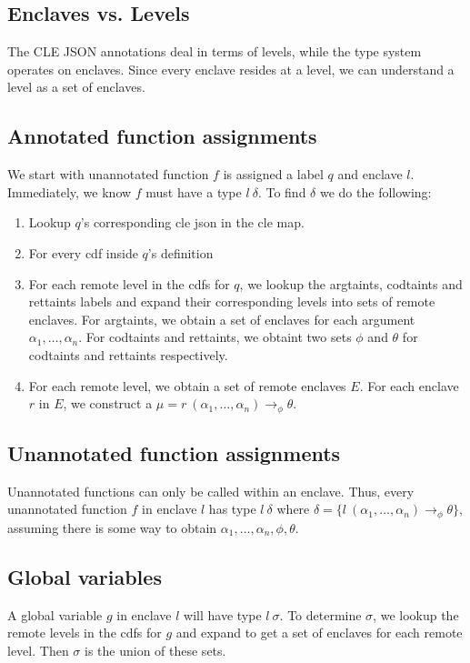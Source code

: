 \documentclass{article}
\begin{document}
\subsection{Enclaves vs. Levels}
The CLE JSON annotations deal in terms of levels, while the type system operates
on enclaves. Since every enclave resides at a level, we can understand a level as
a set of enclaves.

\subsection{Annotated function assignments}
We start with unannotated function $f$ is assigned a label $q$ and enclave $l$.
Immediately, we know $f$ must have a type $l\ \delta$.
To find $\delta$ we do the following: 
\begin{enumerate}
    \item Lookup $q$'s corresponding cle json in the cle map. 
    \item For every cdf inside $q$'s definition
    \item For each remote level in the cdfs for $q$, we lookup the argtaints, 
    codtaints and rettaints labels and expand their corresponding levels into sets of remote enclaves.
    For argtaints, we obtain a set of enclaves for each argument $\alpha_1, \dots, \alpha_n$. 
    For codtaints and rettaints, we obtaint two sets $\phi$ and $\theta$ for codtaints and rettaints 
    respectively. 
    \item For each remote level, we obtain a set of remote enclaves $E$. For each enclave $r$ in $E$,
    we construct a $\mu = r\ (\alpha_1, \dots, \alpha_n) \rightarrow_\phi \theta$.
\end{enumerate}

\subsection{Unannotated function assignments}
Unannotated functions can only be called within an enclave. Thus,
every unannotated function $f$ in enclave $l$ has type $l\ \delta$ where 
$\delta = \{ l\ (\alpha_1, \dots, \alpha_n) \rightarrow_\phi \theta \}$,
assuming there is some way to obtain $\alpha_1, \dots, \alpha_n, \phi, \theta$.

\subsection{Global variables}
A global variable $g$ in enclave $l$ will have type $l\ \sigma$. 
To determine $\sigma$, we lookup the remote levels in the cdfs for $g$
and expand to get a set of enclaves for each remote level. Then $\sigma$ is 
the union of these sets.
\end{document}
